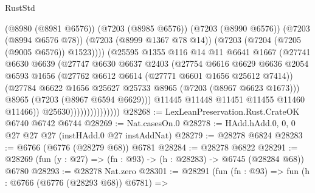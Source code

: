 \begin{lexlean}{RustStd}
\begin{coremodule}
                                    (@8980 (@8981 @6576))
                                    (@7203 (@8985 @6576))
                                    (@7203 (@8990 @6576))
                                    (@7203 (@8994 @6576 @78))
                                    (@7203 (@8999 @1367 @78 @14))
                                    (@7203 (@7204 (@7205 (@9005 @6576)) @1523))))
                                (@25595
                                  @1355
                                  @116
                                  @14
                                  @11
                                  @6641
                                  @1667
                                  (@27741
                                    @6630
                                    @6639
                                    (@27747
                                      @6630
                                      @6637
                                      @2403
                                      (@27754
                                        @6616
                                        @6629
                                        @6636
                                        @2054
                                        @6593
                                        @1656
                                        (@27762 @6612 @6614 (@27771 @6601 @1656 @25612 @7414))
                                        (@27784
                                          @6622
                                          @1656
                                          @25627
                                          @25733
                                          @8965
                                          (@7203 (@8967 @6623 @1673)))
                                        @8965
                                        (@7203 (@8967 @6594 @6629)))
                                      @11445
                                      @11448
                                      @11451
                                      @11455
                                      @11460
                                      @11466))
                                  @25630)))))))))))))))
@28268 := LexLeanPreservation.Rust.CrateOK @6740 @6742 @6744
@28269 := Nat.casesOn.{0}
@28278 := HAdd.hAdd.{0, 0, 0} @27 @27 @27 (instHAdd.{0} @27 instAddNat)
@28279 := @28278 @6824
@28283 := @6766 (@6776 (@28279 @68)) @6781
@28284 := @28278 @6822
@28291 := @28269 (fun (y : @27) => (fn : @93) -> (h : @28283) -> @6745 (@28284 @68)) @6780
@28293 := @28278 Nat.zero
@28301 := @28291
    (fun (fn : @93) =>
    fun (h : @6766 (@6776 (@28293 @68)) @6781) =>

\end{coremodule}
\end{lexlean}
